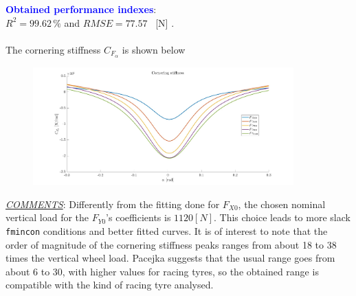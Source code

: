 \documentclass{IEEEtran}
\begin{document}
\begin{itemize}
                \textbf{\textcolor{blue}{Obtained performance indexes}}: \\ $R^{2} = 99.62 \, \%$ and $RMSE = 77.57 $ \, [N] . \\\\
                \newpage
            The cornering stiffness $C_{F_\alpha}$ is shown below 
            \centerline{}
                \begin{figure}[h]
                    \centerline{\includegraphics[width = 3.95in]{corneringK.jpg}}
                    
                    \label{fig:CornFy0}
                \end{figure}
            
        \end{itemize}
        
        
        \textit{\underline{COMMENTS}}: Differently from the fitting done for $F_{X0}$, the chosen nominal vertical load for the $F_{Y0}$'s coefficients is $1120 [N]$. This choice leads to more slack \texttt{fmincon} conditions and better fitted curves.
        It is of interest to note that the order of magnitude of the cornering stiffness peaks ranges from about 18 to 38 times the vertical wheel load. Pacejka\cite{pacejka} suggests that the usual range goes from about 6 to 30, with higher values for racing tyres, so the obtained range is compatible with the kind of racing tyre analysed.
        
        
    
        
        
\end{document}
